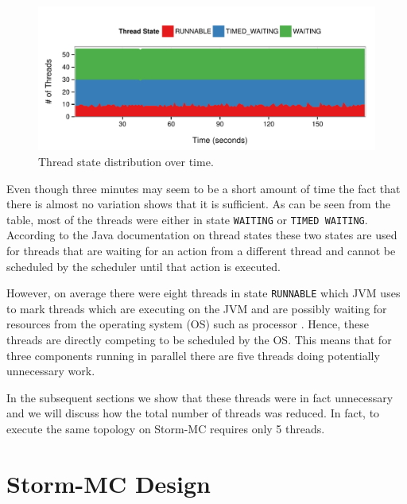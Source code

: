 \documentclass[bsc,twoside,singlespacing,normalheadings,parskip]{infthesis}\usepackage[]{graphicx}\usepackage[]{color}
\makeatletter
\def\maxwidth{ %
  \ifdim\Gin@nat@width>\linewidth
    \linewidth
  \else
    \Gin@nat@width
  \fi
}
\newenvironment{knitrout}{}{} %
\makeatother
\begin{document}
\begin{knitrout}
\color{fgcolor}\begin{figure}[!htb]
\includegraphics[width=\maxwidth]{figure/dump-plot-1} \caption[Thread state distribution over time]{Thread state distribution over time.}\label{fig:dump-plot}
\end{figure}


\end{knitrout}

Even though three minutes may seem to be a short amount of time the fact that there is almost no variation shows that it is sufficient. As can be seen from the table, most of the threads were either in state \texttt{WAITING} or \texttt{TIMED WAITING}. According to the Java documentation on thread states \citep{JavaThreads} these two states are used for threads that are waiting for an action from a different thread and cannot be scheduled by the scheduler until that action is executed.

However, on average there were eight threads in state \texttt{RUNNABLE} which JVM uses to mark threads which are executing on the JVM and are possibly waiting for resources from the operating system (OS) such as processor \citep{JavaThreads}. Hence, these threads are directly competing to be scheduled by the OS. This means that for three components running in parallel there are five threads doing potentially unnecessary work.

In the subsequent sections we show that these threads were in fact unnecessary and we will discuss how the total number of threads was reduced. In fact, to execute the same topology on Storm-MC requires only 5 threads.

\section{Storm-MC Design}
\label{sec:storm_mc_arch}
\end{document}
